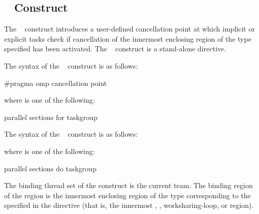 \subsection{~ Construct}
\label{subsec:cancellation point Construct}
\summary
The ~ construct introduces a user-defined cancellation point at
which implicit or explicit tasks check if cancellation of the innermost enclosing region
of the type specified has been activated. The ~ construct is a
stand-alone directive.

\syntax
\begin{ccppspecific}
The syntax of the ~ construct is as follows:

\begin{ompcPragma}
#pragma omp cancellation point 
\end{ompcPragma}

where  is one of the following:

\begin{indentedcodelist}
parallel
sections
for
taskgroup
\end{indentedcodelist}
\end{ccppspecific}

\begin{fortranspecific}
The syntax of the ~ construct is as follows:


where  is one of the following:

\begin{indentedcodelist}
parallel
sections
do
taskgroup
\end{indentedcodelist}
\end{fortranspecific}

\binding
The binding thread set of the  construct is the current team.
The binding region of the  region is the innermost enclosing region of the type corresponding to the 
specified in the directive (that is, the innermost , , worksharing-loop, or
 region).


